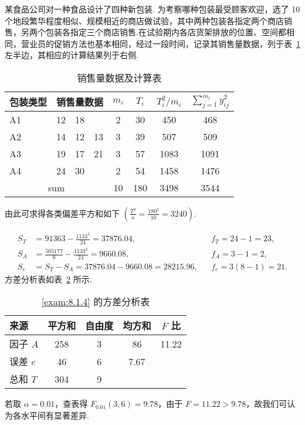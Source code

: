 \begin{example}\label{exam:8.1.4}
某食品公司对一种食品设计了四种新包装. 为考察哪种包装最受顾客欢迎，选了 10 个地段繁华程度相似、规模相近的商店做试验，其中两种包装各指定两个商店销售，另两个包装各指定三个商店销售.在试验期内各店货架排放的位置、空间都相同，营业员的促销方法也基本相同，经过一段时间，记录其销售量数据，列于表~\ref{tab:8.1.6} 左半边，其相应的计算结果列于右侧. 
\begin{table}[htbp]
  \centering
  \caption{销售量数据及计算表}
    \begin{tabular}{cccccccc}
    \toprule
    包装类型 & \multicolumn{3}{c}{销售量数据} & $m_i$ & $T_i$ &$T_i^2/m_i$ & $\sum_{j=1}^{m_i} y_{ij}^2$ \\
    \midrule
    \multicolumn{1}{l}{A1} & \multicolumn{1}{r}{12} & \multicolumn{1}{r}{18} &       & 2     & 30    & 450   & 468 \\
    \multicolumn{1}{l}{A2} & \multicolumn{1}{r}{14} & \multicolumn{1}{r}{12} & \multicolumn{1}{r}{13} & 3     & 39    & 507   & 509 \\
    \multicolumn{1}{l}{A3} & \multicolumn{1}{r}{19} & \multicolumn{1}{r}{17} & \multicolumn{1}{r}{21} & 3     & 57    & 1083  & 1091 \\
    \multicolumn{1}{l}{A4} & \multicolumn{1}{r}{24} & \multicolumn{1}{r}{30} &       & 2     & 54    & 1458  & 1476 \\
    \midrule
    \multicolumn{4}{c}{sum}       & 10    & 180   & 3498  & 3544 \\
    \bottomrule
    \end{tabular}%
  \label{tab:8.1.6}%
\end{table}%

由此可求得各类偏差平方和如下 $\left(\frac{T^{2}}{n}=\frac{180^{2}}{10}=3240\right)$.


\begin{align*}
  S_T & = 91363 - \frac{1133^2}{24} = 37876.04, && f_T = 24-1=23,\\
  S_A &= \frac{505177}{8} - \frac{1133^2}{24} = 9660.08, && f_A = 3 - 1 = 2,\\
  S_e &= S_{T} - S_A = 37876.04 - 9660.08 = 28215.96, && f_{e} = 3(8-1)=21.
\end{align*}
方差分析表如表~\ref{tab:8.1.7} 所示.
  
  \begin{table}[htbp]
    \centering
    \caption{\ref{exam:8.1.4} 的方差分析表}
      \begin{tabular}{lcccc}
      \toprule
      来源    & 平方和   & 自由度   & 均方和   & $F$ 比 \\
      \midrule
      因子 $A$  & 258 & 3    & 86 & 11.22 \\
      误差 $e$  & 46 & 6    & 7.67 &  \\
      总和 $T$  & 304 & 9    &       &  \\
      \bottomrule
      \end{tabular}%
    \label{tab:8.1.7}%
  \end{table}%
  若取 $\alpha=0.01$，查表得 $F_{0.01}(3,6)=9.78$，由于 $F = 11.22 > 9.78$，故我们可认为各水平间有显著差异.
  

\end{example}
